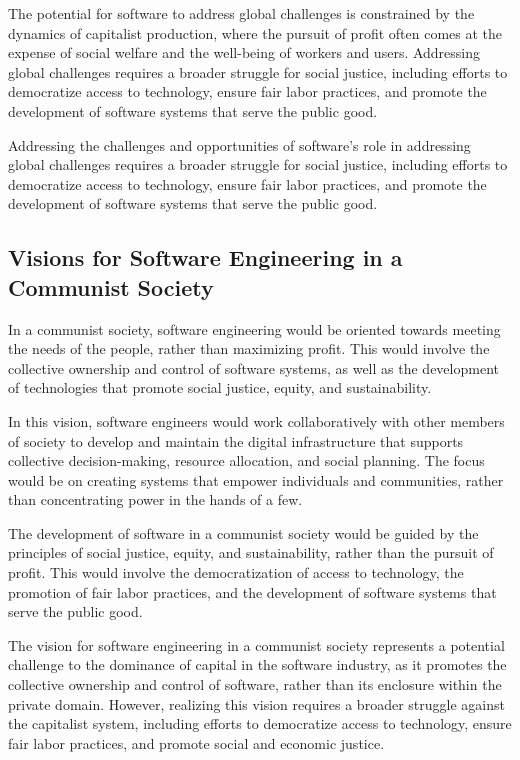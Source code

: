 \begin{refsection}
\begin{multicols}{2}
{The potential for software to address global challenges is constrained by the dynamics of capitalist production, where the pursuit of profit often comes at the expense of social welfare and the well-being of workers and users. Addressing global challenges requires a broader struggle for social justice, including efforts to democratize access to technology, ensure fair labor practices, and promote the development of software systems that serve the public good.

Addressing the challenges and opportunities of software's role in addressing global challenges requires a broader struggle for social justice, including efforts to democratize access to technology, ensure fair labor practices, and promote the development of software systems that serve the public good.

\subsection{Visions for Software Engineering in a Communist Society}

In a communist society, software engineering would be oriented towards meeting the needs of the people, rather than maximizing profit. This would involve the collective ownership and control of software systems, as well as the development of technologies that promote social justice, equity, and sustainability.

In this vision, software engineers would work collaboratively with other members of society to develop and maintain the digital infrastructure that supports collective decision-making, resource allocation, and social planning. The focus would be on creating systems that empower individuals and communities, rather than concentrating power in the hands of a few.

The development of software in a communist society would be guided by the principles of social justice, equity, and sustainability, rather than the pursuit of profit. This would involve the democratization of access to technology, the promotion of fair labor practices, and the development of software systems that serve the public good.

The vision for software engineering in a communist society represents a potential challenge to the dominance of capital in the software industry, as it promotes the collective ownership and control of software, rather than its enclosure within the private domain. However, realizing this vision requires a broader struggle against the capitalist system, including efforts to democratize access to technology, ensure fair labor practices, and promote social and economic justice.

}
\end{multicols}
\end{refsection}
